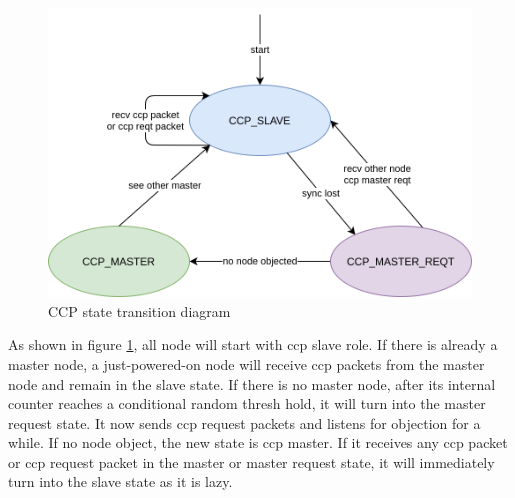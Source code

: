 \documentclass[\main/main.tex]{subfiles}
\begin{document}
\begin{figure}[H]
    \begin{center}
        \includegraphics[scale=0.3]{ccp_state_diagram.png}
    \end{center}
    \caption{CCP state transition diagram}
    \label{fig:CCP_state_diagram}
\end{figure}

As shown in figure \ref{fig:CCP_state_diagram}, all node will start with ccp slave role. If there is already a master node, a just-powered-on node will receive ccp packets from the master node and remain in the slave state. If there is no master node, after its internal counter reaches a conditional random thresh hold, it will turn into the master request state. It now sends ccp request packets and listens for objection for a while. If no node object, the new state is ccp master. If it receives any ccp packet or ccp request packet in the master or master request state, it will immediately turn into the slave state as it is lazy.
\end{document}
